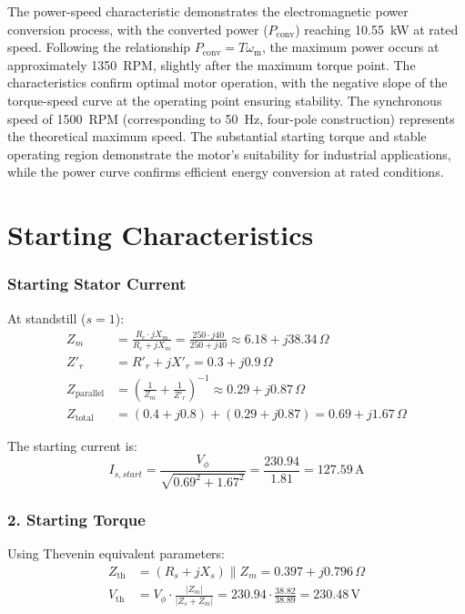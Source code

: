 \documentclass[a4paper,12pt]{article}
\begin{document}
The power-speed characteristic demonstrates the electromagnetic power conversion process, with the converted power ($P_{\text{conv}}$) reaching 10.55~kW at rated speed. Following the relationship $P_{\text{conv}} = T\omega_{\text{m}}$, the maximum power occurs at approximately 1350~RPM, slightly after the maximum torque point. The characteristics confirm optimal motor operation, with the negative slope of the torque-speed curve at the operating point ensuring stability. The synchronous speed of 1500~RPM (corresponding to 50~Hz, four-pole construction) represents the theoretical maximum speed. The substantial starting torque and stable operating region demonstrate the motor's suitability for industrial applications, while the power curve confirms efficient energy conversion at rated conditions. 
 

\section{Starting Characteristics}
\FloatBarrier

\subsubsection{Starting Stator Current}
At standstill ($s = 1$):
\begin{align}
    Z_m &= \frac{R_c \cdot jX_m}{R_c + jX_m} = \frac{250 \cdot j40}{250 + j40} \approx 6.18 + j38.34\,\Omega \\
    Z'_r &= R'_r + jX'_r = 0.3 + j0.9\,\Omega \\
    Z_{\text{parallel}} &= \left(\frac{1}{Z_m} + \frac{1}{Z'_r}\right)^{-1} \approx 0.29 + j0.87\,\Omega \\
    Z_{\text{total}} &= (0.4 + j0.8) + (0.29 + j0.87) = 0.69 + j1.67\,\Omega
\end{align}

The starting current is:
\begin{equation}
    I_{s,start} = \frac{V_{\phi}}{\sqrt{0.69^2 + 1.67^2}} = \frac{230.94}{1.81} = 127.59\,\text{A}
\end{equation}

\subsubsection{2. Starting Torque}
Using Thevenin equivalent parameters:
\begin{align}
    Z_{\text{th}} &= (R_s + jX_s) \parallel Z_m = 0.397 + j0.796\,\Omega \\
    V_{\text{th}} &= V_{\phi} \cdot \frac{|Z_m|}{|Z_s + Z_m|} = 230.94 \cdot \frac{38.82}{38.89} = 230.48\,\text{V}
\end{align}
\end{document}
